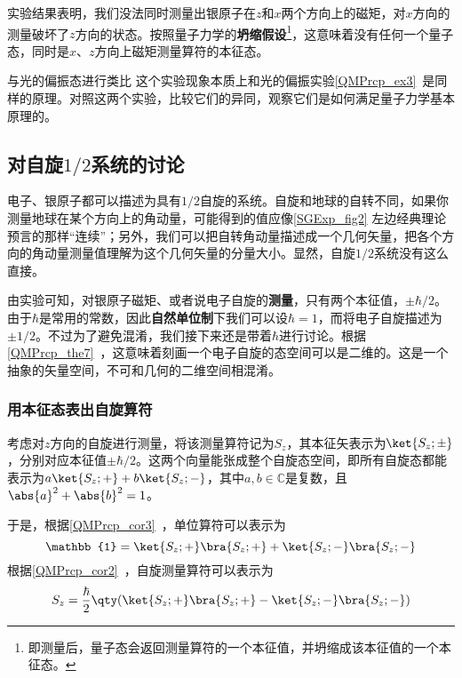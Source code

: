 实验结果表明，我们没法同时测量出银原子在$z$和$x$两个方向上的磁矩，对$x$方向的测量破坏了$z$方向的状态。按照量子力学的\textbf{坍缩假设}\footnote{即测量后，量子态会返回测量算符的一个本征值，并坍缩成该本征值的一个本征态。}，这意味着没有任何一个量子态，同时是$x$、$z$方向上磁矩测量算符的本征态。



\begin{exercise}{与光的偏振态进行类比}
这个实验现象本质上和光的偏振实验\autoref{QMPrcp_ex3}~是同样的原理。对照这两个实验，比较它们的异同，观察它们是如何满足量子力学基本原理的。
\end{exercise}






\subsection{对自旋$1/2$系统的讨论}

电子、银原子都可以描述为具有$1/2$自旋的系统。自旋和地球的自转不同，如果你测量地球在某个方向上的角动量，可能得到的值应像\autoref{SGExp_fig2} 左边经典理论预言的那样“连续”；另外，我们可以把自转角动量描述成一个几何矢量，把各个方向的角动量测量值理解为这个几何矢量的分量大小。显然，自旋$1/2$系统没有这么直接。

由实验可知，对银原子磁矩、或者说电子自旋的\textbf{测量}，只有两个本征值，$\pm\hbar/2$。由于$\hbar$是常用的常数，因此\textbf{自然单位制}下我们可以设$\hbar=1$，而将电子自旋描述为$\pm 1/2$。不过为了避免混淆，我们接下来还是带着$\hbar$进行讨论。根据\autoref{QMPrcp_the7}~，这意味着刻画一个电子自旋的态空间可以是二维的。这是一个抽象的矢量空间，不可和几何的二维空间相混淆。

\subsubsection{用本征态表出自旋算符}

考虑对$z$方向的自旋进行测量，将该测量算符记为$S_z$，其本征矢表示为$\ket{S_z; \pm}$，分别对应本征值$\pm \hbar/2$。这两个向量能张成整个自旋态空间，即所有自旋态都能表示为$a\ket{S_z; +}+b\ket{S_z; -}$，其中$a, b\in\mathbb{C}$是复数，且$\abs{a}^2+\abs{b}^2=1$。

于是，根据\autoref{QMPrcp_cor3}~，单位算符可以表示为
\begin{equation}
\mathbb{1}=\ket{S_z; +}\bra{S_z; +} + \ket{S_z; -}\bra{S_z; -}
\end{equation}
根据\autoref{QMPrcp_cor2}~，自旋测量算符可以表示为
\begin{equation}
S_z=\frac{\hbar}{2}\qty(\ket{S_z; +}\bra{S_z; +} - \ket{S_z; -}\bra{S_z; -})
\end{equation}

